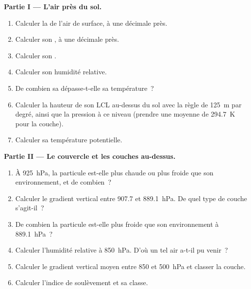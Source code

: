 \begin{problem}
\medskip\noindent\textbf{Partie I --- L'air près du sol.}
\begin{enumerate}
  \item Calculer la  de l'air de surface, à une décimale près.
  \item Calculer son , à une décimale près.
  \item Calculer son .
  \item Calculer son humidité relative.
  \item De combien sa  dépasse-t-elle sa température~?
  \item Calculer la hauteur de son LCL au-dessus du sol avec la règle de \qty{125}{m} par degré, ainsi que la pression
        à ce niveau (prendre une  moyenne de \qty{294.7}{K} pour la couche).
  \item Calculer sa température potentielle.
\end{enumerate}

\medskip\noindent\textbf{Partie II --- Le couvercle et les couches au-dessus.}
\begin{enumerate}[resume]
  \item À \qty{925}{hPa}, la particule est-elle plus chaude ou plus froide que son environnement, et de combien~?
  \item Calculer le gradient vertical entre 907.7 et \qty{889.1}{hPa}. De quel type de couche s'agit-il~?
  \item De combien la particule est-elle plus froide que son environnement à \qty{889.1}{hPa}~?
  \item Calculer l'humidité relative à \qty{850}{hPa}. D'où un tel air a-t-il pu venir~?
  \item Calculer le gradient vertical moyen entre 850 et \qty{500}{hPa} et classer la couche.
  \item Calculer l'indice de soulèvement et sa classe.
\end{enumerate}


\end{problem}
